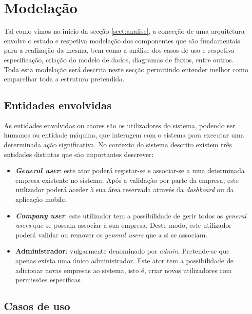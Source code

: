 \section{Modelação}

Tal como vimos no início da secção \ref{sect:analise}, a conceção de uma arquitetura envolve o estudo e respetiva modelação dos componentes que são fundamentais para a realização da mesma, bem como a análise dos casos de uso e respetiva especificação, criação do modelo de dados, diagramas de fluxos, entre outros. Toda esta modelação será descrita neste secção permitindo entender melhor como emparelhar toda a estrutura pretendida. 



\subsection{Entidades envolvidas}

As entidades envolvidas ou atores são os utilizadores do sistema, podendo ser humanos ou entidade máquina, que interagem com o sistema para executar uma determinada ação significativa. No contexto do sistema descrito existem três entidades distintas que são importantes descrever: 

\begin{itemize}
	
	\item \textbf{\textit{General user}}: este ator poderá registar-se e associar-se a uma determinada empresa existente no sistema. Após a validação por parte da empresa, este utilizador poderá aceder à sua área reservada através da \textit{dashboard} ou da aplicação mobile. 
	
	\item \textbf{\textit{Company user}}: este utilizador tem a possibilidade de gerir todos os \textit{general users} que se possam associar à sua empresa. Deste modo, este utilizador poderá validar ou remover os \textit{general users} que a si se associam. 
	
	\item \textbf{Administrador}: vulgarmente denominado por \textit{admin}. Pretende-se que apenas exista uma único administrador. Este ator tem a possibilidade de adicionar novas empresas ao sistema, isto é, criar novos utilizadores com permissões especificas. 
	
\end{itemize}




\subsection{Casos de uso}

